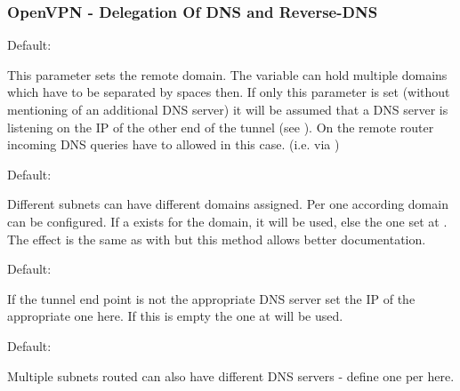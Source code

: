 \subsubsection{OpenVPN - Delegation Of DNS and Reverse-DNS}

\begin{description}


  Default: 

  This parameter sets the remote domain. The variable can hold multiple domains 
  which have to be separated by spaces then. If only this parameter is set (without 
  mentioning of an additional DNS server) it will be assumed that a DNS server is listening 
  on the IP of the other end of the tunnel (see ).
  On the remote router incoming DNS queries have to allowed in this case.
  (i.e. via )


  Default: 

  Different subnets can have different domains assigned. Per  one 
  according domain can be configured. If a  exists for the domain, 
  it will be used, else the one set at . The effect is the same as 
  with  but this method allows better documentation.


  Default: 

  If the tunnel end point is not the appropriate DNS server set the IP of the appropriate one here.
  If this is empty the one at  will 
  be used.


  Default: 

  Multiple subnets routed can also have different DNS servers - define one per 
   here.

\end{description}

